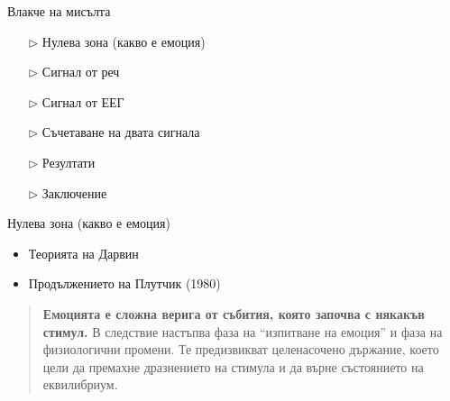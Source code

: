 \documentclass[9pt]{beamer}
\begin{document}
    \begin{frame}{Влакче на мисълта}
        \begin{center}
        \begin{itemize}
            \setlength\itemsep{\fill}
            \item[$\triangleright$] Нулева зона (какво е емоция)
            \pause 
            \item[$\triangleright$] Сигнал от реч
            \pause 
            \item[$\triangleright$] Сигнал от ЕЕГ
            \pause 
            \item[$\triangleright$] Съчетаване на двата сигнала
            \pause 
            \item[$\triangleright$] Резултати
            \pause 
            \item[$\triangleright$] Заключение
        \end{itemize}
        \end{center}
    \end{frame}
    \begin{frame}{Нулева зона (какво е емоция)}
        \begin{itemize}
            \setlength\itemsep{\fill}
            \item Теорията на Дарвин
            \pause
            \item Продължението на Плутчик (1980)
        \end{itemize}
        \pause
        \begin{quote}
            \textbf{Емоцията е сложна верига от събития, която започва с някакъв стимул.} В следствие настъпва фаза на ``изпитване на емоция'' и фаза на физиологични промени. Те предизвикват целенасочено държание, което цели да премахне дразнението на стимула и да върне състоянието на еквилибриум.
        \end{quote}
    \end{frame}
\end{document}
